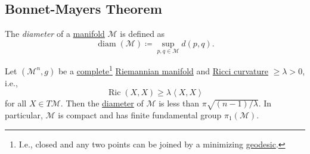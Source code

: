 \subsection{Bonnet-Mayers Theorem}
\begin{definition}[Diameter]\label{def:diameter}
	The \emph{diameter} of a \hyperref[def:smooth-manifold]{manifold} \(\mathcal{M} \) is defined as
	\[
		\mathop{\mathrm{diam}}(\mathcal{M} ) \coloneqq \sup _{p, q\in \mathcal{M} } d(p, q).
	\]
\end{definition}

\begin{theorem}\label{thm:Bonnet-Mayers}
	Let \((\mathcal{M}^n , g)\) be a \hyperref[def:geodesically-complete]{complete}\footnote{I.e., closed and any two points can be joined by a minimizing \hyperref[def:geodesic]{geodesic}.} \hyperref[def:Riemannian-manifold]{Riemannian manifold} and \hyperref[def:Ricci-curvature]{Ricci curvature} \(\geq \lambda > 0\), i.e.,
	\[
		\mathop{\mathrm{Ric}}(X, X) \geq \lambda \left\langle X, X \right\rangle
	\]
	for all \(X\in T\mathcal{M} \). Then the \hyperref[def:diameter]{diameter} of \(\mathcal{M} \) is less than \(\pi \sqrt{(n - 1) / \lambda } \). In particular, \(\mathcal{M} \) is compact and has finite fundamental group \(\pi _1(\mathcal{M} )\).
\end{theorem}
